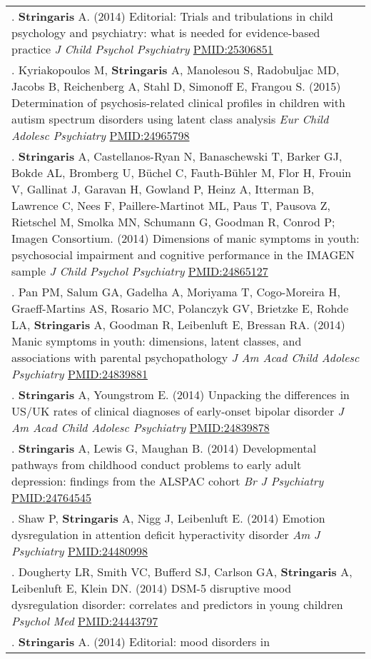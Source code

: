 \documentclass[
]{article}
\begin{document}
\begin{longtable}[]{@{}
  >{\raggedright\arraybackslash}p{}@{}}
146. \textbf{Stringaris} A. (2014) Editorial: Trials and tribulations in
child psychology and psychiatry: what is needed for evidence-based
practice \emph{J Child Psychol Psychiatry} \url{PMID:25306851} \\
147. Kyriakopoulos M, \textbf{Stringaris} A, Manolesou S, Radobuljac MD,
Jacobs B, Reichenberg A, Stahl D, Simonoff E, Frangou S. (2015)
Determination of psychosis-related clinical profiles in children with
autism spectrum disorders using latent class analysis \emph{Eur Child
Adolesc Psychiatry} \url{PMID:24965798} \\
148. \textbf{Stringaris} A, Castellanos-Ryan N, Banaschewski T, Barker
GJ, Bokde AL, Bromberg U, Büchel C, Fauth-Bühler M, Flor H, Frouin V,
Gallinat J, Garavan H, Gowland P, Heinz A, Itterman B, Lawrence C, Nees
F, Paillere-Martinot ML, Paus T, Pausova Z, Rietschel M, Smolka MN,
Schumann G, Goodman R, Conrod P; Imagen Consortium. (2014) Dimensions of
manic symptoms in youth: psychosocial impairment and cognitive
performance in the IMAGEN sample \emph{J Child Psychol Psychiatry}
\url{PMID:24865127} \\
149. Pan PM, Salum GA, Gadelha A, Moriyama T, Cogo-Moreira H,
Graeff-Martins AS, Rosario MC, Polanczyk GV, Brietzke E, Rohde LA,
\textbf{Stringaris} A, Goodman R, Leibenluft E, Bressan RA. (2014) Manic
symptoms in youth: dimensions, latent classes, and associations with
parental psychopathology \emph{J Am Acad Child Adolesc Psychiatry}
\url{PMID:24839881} \\
150. \textbf{Stringaris} A, Youngstrom E. (2014) Unpacking the
differences in US/UK rates of clinical diagnoses of early-onset bipolar
disorder \emph{J Am Acad Child Adolesc Psychiatry}
\url{PMID:24839878} \\
151. \textbf{Stringaris} A, Lewis G, Maughan B. (2014) Developmental
pathways from childhood conduct problems to early adult depression:
findings from the ALSPAC cohort \emph{Br J Psychiatry}
\url{PMID:24764545} \\
152. Shaw P, \textbf{Stringaris} A, Nigg J, Leibenluft E. (2014) Emotion
dysregulation in attention deficit hyperactivity disorder \emph{Am J
Psychiatry} \url{PMID:24480998} \\
153. Dougherty LR, Smith VC, Bufferd SJ, Carlson GA, \textbf{Stringaris}
A, Leibenluft E, Klein DN. (2014) DSM-5 disruptive mood dysregulation
disorder: correlates and predictors in young children \emph{Psychol Med}
\url{PMID:24443797} \\
154. \textbf{Stringaris} A. (2014) Editorial: mood disorders in

\end{longtable}
\end{document}
